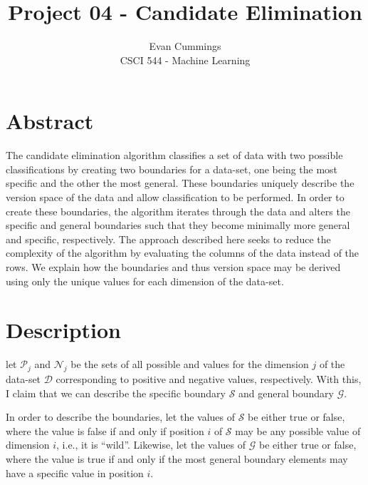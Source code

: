 
\DeclareMathOperator*{\argmax}{arg\,max}

\usepackage[top=.5in, bottom=.5in, left=.5in, right=.5in]{geometry}
\usepackage{natbib}


\small

\title{Project 04 - Candidate Elimination}
\author{Evan Cummings\\
CSCI 544 - Machine Learning}

\maketitle

\section*{Abstract}

The candidate elimination algorithm classifies a set of data with two possible classifications by creating two boundaries for a data-set, one being the most specific and the other the most general.  These boundaries uniquely describe the version space of the data and allow classification to be performed.  In order to create these boundaries, the algorithm iterates through the data and alters the specific and general boundaries such that they become minimally more general and specific, respectively.  The approach described here seeks to reduce the complexity of the algorithm by evaluating the columns of the data instead of the rows. We explain how the boundaries and thus version space may be derived using only the unique values for each dimension of the data-set.

\section*{Description}

let $\mathcal{P}_j$ and $\mathcal{N}_j$ be the sets of all possible and values for the dimension $j$ of the data-set $\mathcal{D}$ corresponding to positive and negative values, respectively.  With this, I claim that we can describe the specific boundary $\mathcal{S}$ and general boundary $\mathcal{G}$.

In order to describe the boundaries, let the values of $\mathcal{S}$ be either true or false, where the value is false if and only if position $i$ of $\mathcal{S}$ may be any possible value of dimension $i$, i.e., it is ``wild''.  Likewise, let the values of $\mathcal{G}$ be either true or false, where the value is true if and only if the most general boundary elements may have a specific value in position $i$.

